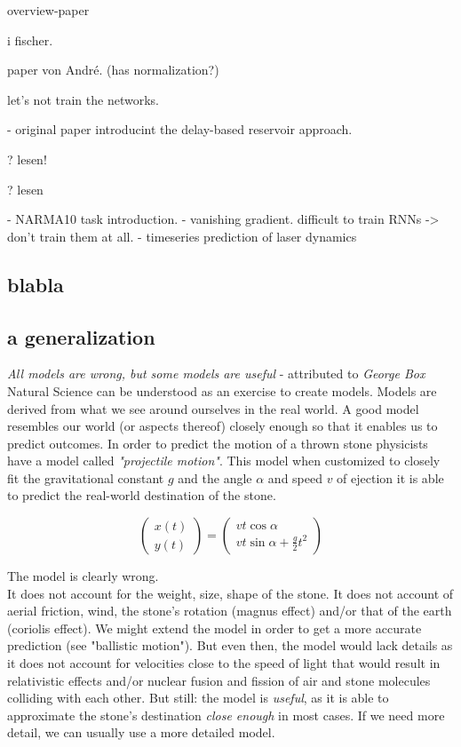 	\cite{SAN17a} overview-paper

	\cite{LAR12} i fischer.
	
	\cite{ROE18a} paper von André. (has normalization?)
	
	\cite{JAE01} let's not train the networks.
	
	\cite{APP11} - original paper introducint the delay-based reservoir approach.
	
	\cite{ANT19} ? lesen!
	
	\cite{STE20} ? lesen
	
	\cite{ATI00} - NARMA10 task introduction.
	\cite{HOCHREITER98} - vanishing gradient. difficult to train RNNs -> don't train them at all.
	\cite{AMI19} - timeseries prediction of laser dynamics


\subsection{blabla}


\subsection{a generalization}
	\emph{All models are wrong, but some models are useful} - attributed to \emph{George Box}\\
	
	Natural Science can be understood as an exercise to create models. Models are derived from what we see around ourselves in the real world. A good model resembles our world (or aspects thereof) closely enough so that it enables us to predict outcomes. In order to predict the motion of a thrown stone physicists have a model called \emph{"projectile motion"}. This model when customized to closely fit the gravitational constant $g$ and the angle $\alpha$ and speed $v$ of ejection it is able to predict the real-world destination of the stone. 
	
	\begin{equation}
	\left(\begin{matrix} x(t) \\ y(t) \end{matrix}\right) = \left(\begin{matrix} v t \cos\alpha \\ v t \sin \alpha + \frac{g}{2 }t^2 \end{matrix} \right)
	\end{equation}
	
	The model is clearly wrong. \\
	It does not account for the weight, size, shape of the stone. It does not account of aerial friction, wind, the stone's rotation (magnus effect) and/or that of the earth (coriolis effect). We might extend the model in order to get a more accurate prediction (see "ballistic motion"). But even then, the model would lack details as it does not account for  velocities close to the speed of light that would result in relativistic effects and/or nuclear fusion and fission of air and stone molecules colliding with each other. 
	But still: the model is \emph{useful}, as it is able to approximate the stone's destination \emph{close enough} in most cases. If we need more detail, we can usually use a more detailed model.
	
